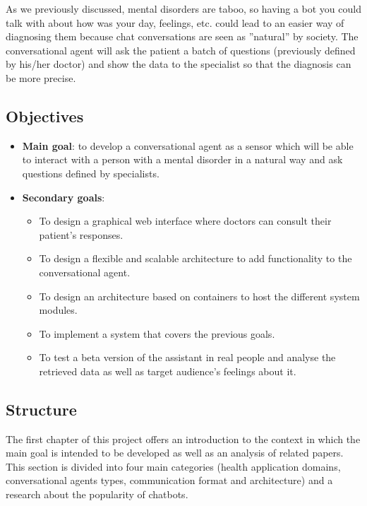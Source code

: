 \documentclass[12pt,english]{article}
\begin{document}
As we previously discussed, mental disorders are taboo, so having a bot you could talk with about how was your day, feelings, etc. could lead to an easier way of diagnosing them because chat conversations are seen as ''natural'' by society. The conversational agent will ask the patient a batch of questions (previously defined by his/her doctor) and show the data to the specialist so that the diagnosis can be more precise.

\newpage

\subsection{Objectives}

\begin{itemize}
  \item \textbf{Main goal}: to develop a conversational agent as a sensor which will be able to interact with a person with a mental disorder in a natural way and ask questions defined by specialists.
  \item \textbf{Secondary goals}:
    \begin{itemize}
      \item To design a graphical web interface where doctors can consult their patient's responses.
      \item To design a flexible and scalable architecture to add functionality to the conversational agent.
      \item To design an architecture based on containers to host the different system modules.
      \item To implement a system that covers the previous goals.
      \item To test a beta version of the assistant in real people and analyse the retrieved data as well as target audience's feelings about it.
    \end{itemize}
\end{itemize}

\subsection{Structure}

The first chapter of this project offers an introduction to the context in which the main goal is intended to be developed as well as an analysis of related papers. This section is divided into four main categories (health application domains, conversational agents types, communication format and architecture) and a research about the popularity of chatbots.\\
\end{document}
